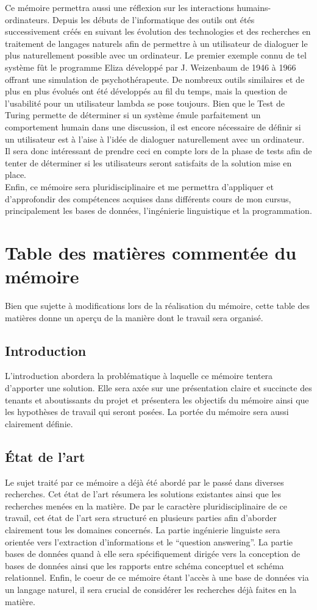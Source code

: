 \documentclass[a4paper,12pt]{article}
\begin{document}
Ce mémoire permettra aussi une réflexion sur les interactions humains-ordinateurs.
Depuis les débuts de l'informatique des outils ont étés successivement créés en suivant les évolution des technologies et des recherches en traitement de langages naturels afin de permettre à un utilisateur de dialoguer le plus naturellement possible avec un ordinateur.
Le premier exemple connu de tel système fût le programme Eliza développé par J. Weizenbaum de 1946 à 1966 offrant une simulation de psychothérapeute.
De nombreux outils similaires et de plus en plus évolués ont été développés au fil du temps, mais la question de l'usabilité pour un utilisateur lambda se pose toujours.
Bien que le Test de Turing permette de déterminer si un système émule parfaitement un comportement humain dans une discussion, il est encore nécessaire de définir si un utilisateur est à l'aise à l'idée de dialoguer naturellement avec un ordinateur.
Il sera donc intéressant de prendre ceci en compte lors de la phase de tests afin de tenter de déterminer si les utilisateurs seront satisfaits de la solution mise en place. \\

Enfin, ce mémoire sera pluridisciplinaire et me permettra d'appliquer et d'approfondir des compétences acquises dans différents cours de mon cursus, principalement les bases de données, l'ingénierie linguistique et la programmation. 
\newpage
\section{Table des matières commentée du mémoire}
Bien que sujette à modifications lors de la réalisation du mémoire, cette table des matières donne un aperçu de la manière dont le travail sera organisé.
\subsection{Introduction}
L'introduction abordera la problématique à laquelle ce mémoire tentera d'apporter une solution.
Elle sera axée sur une présentation claire et succincte des tenants et aboutissants du projet et présentera les objectifs du mémoire ainsi que les hypothèses de travail qui seront posées.
La portée du mémoire sera aussi clairement définie.
\subsection{État de l'art}
Le sujet traité par ce mémoire a déjà été abordé par le passé dans diverses recherches.
Cet état de l'art résumera les solutions existantes ainsi que les recherches menées en la matière.
De par le caractère pluridisciplinaire de ce travail, cet état de l'art sera structuré en plusieurs parties afin d'aborder clairement tous les domaines concernés.
La partie ingénierie linguiste sera orientée vers l'extraction d'informations et le ``question answering''.
La partie bases de données quand à elle sera spécifiquement dirigée vers la conception de bases de données ainsi que les rapports entre schéma conceptuel et schéma relationnel.
Enfin, le coeur de ce mémoire étant l'accès à une base de données via un langage naturel, il sera crucial de considérer les recherches déjà faites en la matière.
\end{document}
